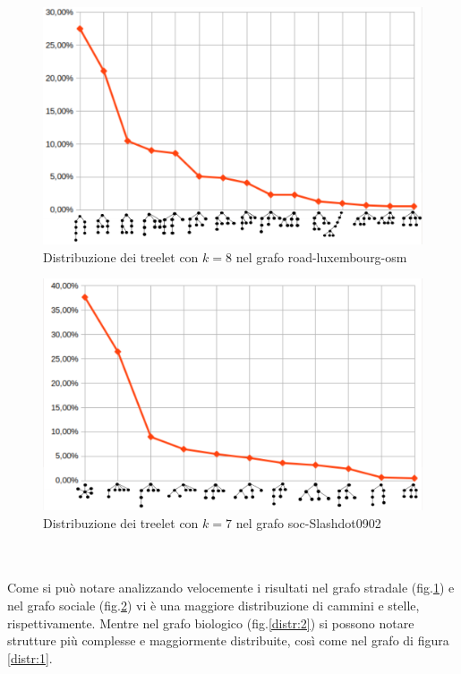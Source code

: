 \begin{figure}[htbp]
		\centering
	\includegraphics[width=15.4cm]{capitolo4/grafoROAD}	
		\caption{Distribuzione dei treelet con $ k=8 $ nel grafo road-luxembourg-osm }
		\label{distr:3}
\end{figure}
\begin{figure}[htbp]
		
	\includegraphics[width=15.4cm]{capitolo4/grafoALSH}
	\caption{Distribuzione dei treelet con $ k=7 $ nel grafo soc-Slashdot0902}
	\label{distr:4}
\end{figure}\mbox{}\\\\

Come si può notare analizzando velocemente i risultati nel grafo stradale (fig.\ref{distr:3}) e nel grafo sociale (fig.\ref{distr:4}) vi è una maggiore distribuzione di cammini e stelle, rispettivamente.
Mentre nel grafo biologico (fig.\ref{distr:2}) si possono notare strutture più complesse e maggiormente distribuite, così come nel grafo di figura \ref{distr:1}.

